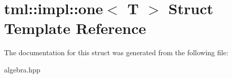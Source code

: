 \hypertarget{structtml_1_1impl_1_1one}{\section{tml\+:\+:impl\+:\+:one$<$ T $>$ Struct Template Reference}
\label{structtml_1_1impl_1_1one}
}


The documentation for this struct was generated from the following file\+:\begin{DoxyCompactItemize}
\item 
algebra.\+hpp\end{DoxyCompactItemize}
